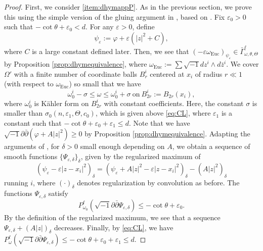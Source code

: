 \documentclass{amsart}
\numberwithin{equation}{section}
\theoremstyle{plain}
\theoremstyle{definition}
\theoremstyle{remark}
\newcommand{\delb}{\sqrt{-1}\partial\bar{\partial}}
\begin{document}
\begin{proof}
    First, we consider \ref{item:dhymappP}. As in the previous section, we prove this using the simple version of the gluing argument in 
    \cite[Section 4 and p596--p597]{GChen}, based on \cite{BK}. Fix $\varepsilon_0>0$ such that $-\cot\theta+\varepsilon_0< d$. For any $\varepsilon>0$, define
    $$\psi_\varepsilon:=\varphi+\varepsilon(\vert z\vert^2+C),$$
    where $C$ is a large constant defined later. Then, we see that $(-\varepsilon\omega_\mathrm{Euc})_{\psi_\varepsilon}\in\bar{\Gamma}^\ell_{\omega,\theta,\Theta}$ by Proposition \ref{prop:dhymequivalence}, where $\omega_\mathrm{Euc}:=\sum\sqrt{-1}dz^i\wedge d\bar{z}^i$. We cover $\Omega'$ with a finite number of coordinate balls $B^i_r$ centered at $x_i$ of radius $r\ll1$ (with respect to $\omega_\mathrm{Euc}$) so small that we have 
    \begin{equation}\label{eq:dhymconstomega}
        \omega_0^i-\sigma\le\omega\le\omega^i_0+\sigma \ \text{on} \ B^i_{2r}:=B_{2r}(x_i),
    \end{equation}
    where $\omega_0^i$ is Kähler form on $B^i_{2r}$ with constant coefficients. Here, the constant $\sigma$ is smaller than $\sigma_0(n,\varepsilon_1,\Theta,c_0)$, which is given above \eqref{eq:CL}, where $\varepsilon_1$ is a constant such that $-\cot\theta+\varepsilon_0+\varepsilon_1\le d$. Note that we have $\delb (\varphi+A\vert z\vert^2)\ge0$ by Proposition \ref{prop:dhymequivalence}.  
    Adapting the arguments of \cite[Proposition 4.3 (3)]{GChen}, for $\delta>0$ small enough depending on $A$, we obtain a sequence of smooth functions $\{\Psi_{\varepsilon,\delta}\}_\delta$, given by the regularized maximum of 
    \begin{equation}\label{eq:dhympsidelta}
        (\psi_\varepsilon-\varepsilon\vert z-x_i\vert^2)_\delta=(\psi_\varepsilon+A\vert z\vert^2-\varepsilon\vert z-x_i\vert^2)_\delta-(A\vert z\vert^2)_\delta
    \end{equation}
    running $i$, where $(\cdot)_\delta$ denotes regularization by convolution as before. 
    The functions $\Psi_{\varepsilon,\delta}$ satisfy
    $$P^\ell_{\omega_0}(\delb\Psi_{\varepsilon,\delta})\le -\cot\theta+\varepsilon_0.$$
    By the definition of the regularized maximum, we see that a sequence
    $\Psi_{\varepsilon,\delta}+(A\vert z\vert)_\delta$ decreases.
    Finally, by \eqref{eq:CL}, we have $P^\ell_\omega(\delb\Psi_{\varepsilon,\delta})\le-\cot\theta+\varepsilon_0+\varepsilon_1\le d$.
    

\end{proof}
\end{document}
